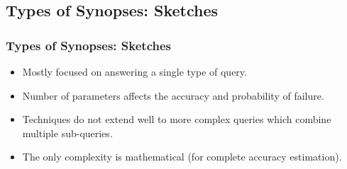 \documentclass{beamer}
\begin{document}
\subsection{Types of Synopses: Sketches}
\begin{frame}
\frametitle{Types of Synopses: Sketches}
\begin{itemize}
\item{Mostly focused on answering a single type of query.}
\item{Number of parameters affects the accuracy and probability of failure.}
\item{Techniques do not extend well to more complex queries which combine multiple sub-queries.}
\item{The only complexity is mathematical (for complete accuracy estimation).}
\end{itemize}
\end{frame}

\end{document}
